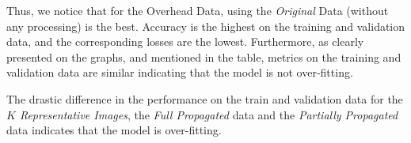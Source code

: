 \documentclass[10pt]{article}
\begin{document}
    \begin{mdframed}
        Thus, we notice that for the Overhead Data, using the \emph{Original} Data (without any processing) is the best. Accuracy is the highest on the training and validation data, and the corresponding losses are the lowest. Furthermore, as clearly presented on the graphs, and mentioned in the table, metrics on the training and validation data are similar indicating that the model is not over-fitting.
        
        The drastic difference in the performance on the train and validation data for the \emph{$K$ Representative Images}, the \emph{Full Propagated} data and the \emph{Partially Propagated} data indicates that the model is over-fitting.
    \end{mdframed}
\end{document}
